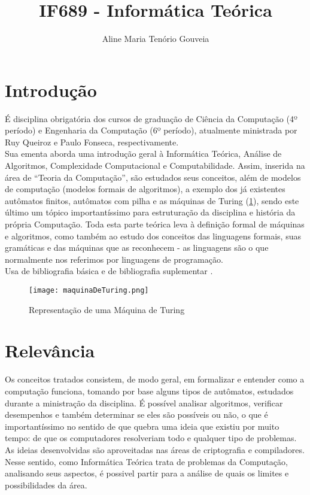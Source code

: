 \documentclass[a4paper]{article}
\title{IF689 - Informática Teórica}
\author{Aline Maria Tenório Gouveia}
\begin{document}
\maketitle

\section{Introdução}
	É disciplina obrigatória dos cursos de graduação de Ciência da Computação (4º período) e Engenharia da Computação (6º período), atualmente ministrada por Ruy Queiroz e Paulo Fonseca, respectivamente.\\
	\indent Sua ementa aborda uma introdução geral à Informática Teórica, Análise de Algoritmos, Complexidade Computacional e Computabilidade. Assim, inserida na área de “Teoria da Computação”, são estudados seus conceitos, além de modelos de computação (modelos formais de algoritmos), a exemplo dos já existentes autômatos finitos, autômatos com pilha e as máquinas de Turing (\ref{fig:maquinasT}), sendo este último um tópico importantíssimo para estruturação da disciplina e história da própria Computação. Toda esta parte teórica leva à definição formal de máquinas e algoritmos, como também ao estudo dos conceitos das linguagens formais, suas gramáticas e das máquinas que as reconhecem - as linguagens são o que normalmente nos referimos por linguagens de programação.\\ 
    \indent Usa de bibliografia básica \cite{1} e de bibliografia suplementar \cite{2} \cite{3} \cite{4} \cite{5}.
    
\begin{figure}[h]
\centering
\texttt{[image: maquinaDeTuring.png]}
\caption{\label{fig:maquinasT}Representação de uma Máquina de Turing}
\end{figure}
%

\section{Relevância}
	Os conceitos tratados consistem, de modo geral, em formalizar e entender como a computação funciona, tomando por base alguns tipos de autômatos, estudados durante a ministração da disciplina. É possível analisar algoritmos, verificar desempenhos e também determinar se eles são possíveis ou não, o que é importantíssimo no sentido de que quebra uma ideia que existiu por muito tempo: de que os computadores resolveriam todo e qualquer tipo de problemas. As ideias desenvolvidas são aproveitadas nas áreas de criptografia e compiladores.\\
	\indent Nesse sentido, como Informática Teórica trata de problemas da Computação, analisando seus aspectos, é possivel partir para a análise  de quais os limites e possibilidades da área.   
    
\end{document}
